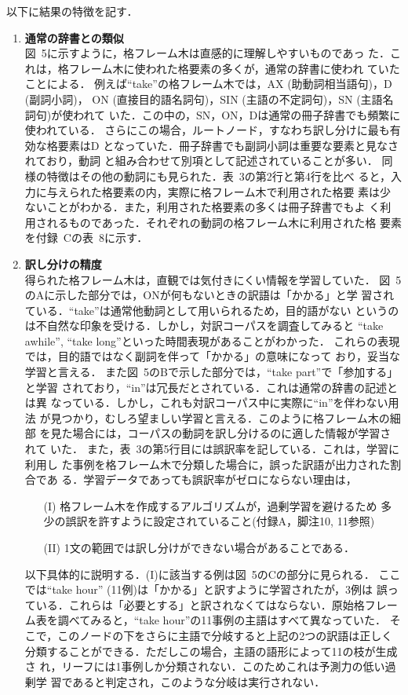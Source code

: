 以下に結果の特徴を記す．
\begin{enumerate}
\item {\bf 通常の辞書との類似}\\
  図~5に示すように，格フレーム木は直感的に理解しやすいものであっ
  た．これは，格フレーム木に使われた格要素の多くが，通常の辞書に使われ
  ていたことによる．
  例えば``take''の格フレーム木では，AX (助動詞相当語句)，D (副詞小詞)，
  ON (直接目的語名詞句)，SIN (主語の不定詞句)，SN (主語名詞句)が使われて
  いた．この中の，SN，ON，Dは通常の冊子辞書でも頻繁に使われている．
  さらにこの場合，ルートノード，すなわち訳し分けに最も有効な格要素はD
  となっていた．冊子辞書でも副詞小詞は重要な要素と見なされており，動詞
  と組み合わせて別項として記述されていることが多い．
  同様の特徴はその他の動詞にも見られた．表~3の第2行と第4行を比べ
  ると，入力に与えられた格要素の内，実際に格フレーム木で利用された格要
  素は少ないことがわかる．また，利用された格要素の多くは冊子辞書でもよ
  く利用されるものであった．それぞれの動詞の格フレーム木に利用された格
  要素を付録~Cの表~8に示す．

\item {\bf 訳し分けの精度}\\
  得られた格フレーム木は，直観では気付きにくい情報を学習していた．
  図~5のAに示した部分では，ONが何もないときの訳語は「かかる」と学
  習されている．``take''は通常他動詞として用いられるため，目的語がない
  というのは不自然な印象を受ける．しかし，対訳コーパスを調査してみると
  ``take awhile'', ``take long''といった時間表現があることがわかった．
  これらの表現では，目的語ではなく副詞を伴って「かかる」の意味になって
  おり，妥当な学習と言える．
  また図~5のBで示した部分では，``take part''で「参加する」と学習
  されており，``in''は冗長だとされている．これは通常の辞書の記述とは異
  なっている．しかし，これも対訳コーパス中に実際に``in''を伴わない用法
  が見つかり，むしろ望ましい学習と言える．このように格フレーム木の細部
  を見た場合には，コーパスの動詞を訳し分けるのに適した情報が学習されて
  いた．
  また，表~3の第5行目には誤訳率を記している．これは，学習に利用し
  た事例を格フレーム木で分類した場合に，誤った訳語が出力された割合であ
  る．学習データであっても誤訳率がゼロにならない理由は，
\begin{itemize}
\item[(I)] 格フレーム木を作成するアルゴリズムが，過剰学習を避けるため
  多少の誤訳を許すように設定されていること(付録A，脚注10, 11参照)
\item[(II)] 1文の範囲では訳し分けができない場合があることである．
\end{itemize}
以下具体的に説明する．(I)に該当する例は図~5のCの部分に見られる．
ここでは``take hour'' (11例)は「かかる」と訳すように学習されたが，3例は
誤っている．これらは「必要とする」と訳されなくてはならない．原始格フレー
ム表を調べてみると，``take hour''の11事例の主語はすべて異なっていた．
そこで，このノードの下をさらに主語で分岐すると上記の2つの訳語は正しく
分類することができる．ただしこの場合，主語の語形によって11の枝が生成さ
れ，リーフには1事例しか分類されない．このためこれは予測力の低い過剰学
習であると判定され，このような分岐は実行されない．


\end{enumerate}
